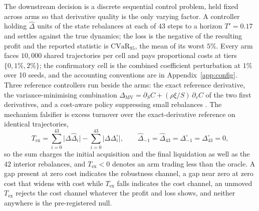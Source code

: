 \documentclass{article}
\begin{document}
The downstream decision is a discrete sequential control problem, held fixed across
arms so that derivative quality is the only varying factor. A controller holding
$\hat{\Delta}$ units of the state rebalances at each of $43$ steps to a horizon
$T' = 0.17$ and settles against the true dynamics; the loss is the negative of the
resulting profit and the reported statistic is $\mathrm{CVaR}_{95}$, the mean of its
worst $5\%$. Every arm faces $10{,}000$ shared trajectories per cell and pays proportional costs
at tiers $\{0, 1\%, 2\%\}$; the confirmatory cell is the combined coefficient
perturbation at $1\%$ over 10 seeds, and the accounting conventions are in
Appendix~\ref{app:config}. Three reference controllers run beside the arms: the
exact reference derivative, the variance-minimising combination
$\Delta_{\mathrm{MV}} = \partial_S C + (\rho\xi/S)\,\partial_v C$ of the two first
derivatives,%
 and a cost-aware policy suppressing small rebalances
\citep{whalley1997asymptotic}. The mechanism falsifier is excess turnover over the
exact-derivative reference on identical trajectories,
\begin{equation}\label{eq:tex}
T_{\mathrm{ex}}=\sum_{i=0}^{43}\bigl|\Delta\hat{\Delta}_i\bigr|
-\sum_{i=0}^{43}\bigl|\Delta\Delta^{\circ}_i\bigr|,
\qquad
\hat{\Delta}_{-1}=\hat{\Delta}_{43}=\Delta^{\circ}_{-1}=\Delta^{\circ}_{43}=0,
\end{equation}
so the sum charges the initial acquisition and the final liquidation as well as
the $42$ interior rebalances, and $T_{\mathrm{ex}} < 0$ denotes an arm trading less
than the oracle. A gap present
at zero cost indicates the robustness channel, a gap near zero at zero cost that
widens with cost while $T_{\mathrm{ex}}$ falls indicates the cost channel, an
unmoved $T_{\mathrm{ex}}$ rejects the cost channel whatever the profit and loss
shows, and neither anywhere is the pre-registered null.
\end{document}

